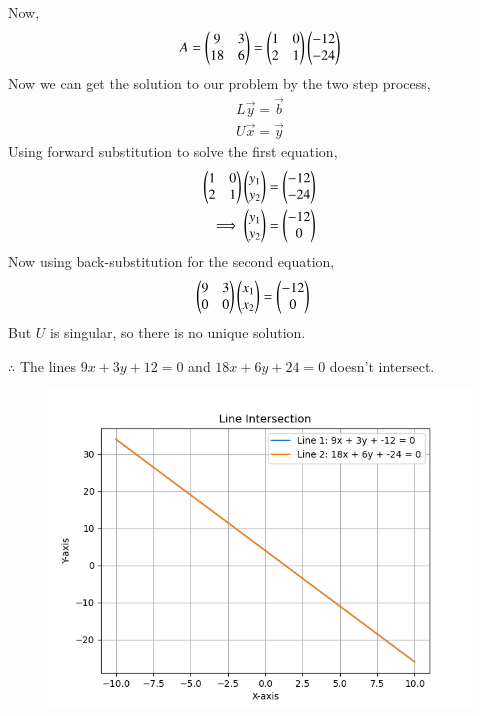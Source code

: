 \documentclass[journal]{IEEEtran}
\numberwithin{equation}{enumi}
\numberwithin{figure}{enumi}
\begin{document}
\begin{enumerate}
Now,
\begin{align}
    A = \begin{pmatrix}9&3\\18&6\end{pmatrix}= \begin{pmatrix}1 & 0\\ 2 & 1\end{pmatrix}\begin{pmatrix}-12\\-24\end{pmatrix}
\end{align}
Now we can get the solution to our problem by the two step process,
\begin{align}
    L\vec{y} = \vec{b}\\
    U\vec{x} = \vec{y}
\end{align}
Using forward substitution to solve the first equation,
\begin{align}
     \begin{pmatrix}1 & 0\\ 2 & 1\end{pmatrix}\begin{pmatrix}y_1 \\ y_2\end{pmatrix} &= \begin{pmatrix}-12\\-24\end{pmatrix}\\
    \implies \begin{pmatrix}y_1 \\ y_2\end{pmatrix} &= \begin{pmatrix}-12 \\ 0\end{pmatrix}\\
\end{align}
Now using back-substitution for the second equation,
\begin{align}
    \begin{pmatrix}9&3\\0&0\end{pmatrix} \begin{pmatrix}x_1 \\ x_2\end{pmatrix} &=  \begin{pmatrix}-12\\0\end{pmatrix}
\end{align}
But $U$ is singular, so there is no unique solution.

$\therefore$ The lines $9x + 3y + 12 = 0 $ and $18x + 6y + 24 = 0 $  doesn't intersect.

\end{enumerate}
\begin{figure}[h!]
   \centering
   \includegraphics[width=0.7\linewidth]{figs/Figure_1.png}
\end{figure}
\end{document}
